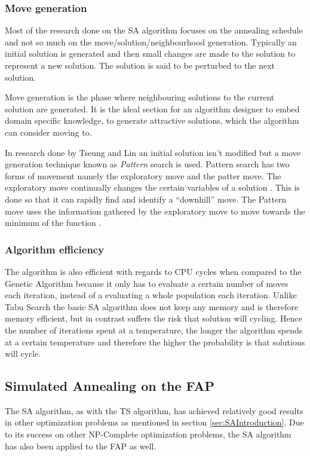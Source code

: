 \subsubsection{Move generation}
Most of the research done on the SA algorithm focuses on the annealing schedule and not so much on the move/solution/neighbourhood generation. Typically an initial solution is generated and then small changes are made to the solution to represent a new solution. The solution is said to be perturbed to the next solution.

Move generation is the phase where neighbouring solutions to the current solution are generated. It is the ideal section for an algorithm designer to embed domain specific knowledge, to generate attractive solutions, which the algorithm can consider moving to.

In research done by Tseung and Lin \cite{CurveFittingSA} an initial solution isn't modified but a move generation technique known as \emph{Pattern} search is used. Pattern search has two forms of movement namely the exploratory move and the patter move. The exploratory move continually changes the certain variables of a solution \cite{CurveFittingSA}. This is done so that it can rapidly find and identify a ``downhill'' move. The Pattern move uses the information gathered by the exploratory move to move towards the minimum of the function \cite{CurveFittingSA}.
\subsubsection{Algorithm efficiency}
The algorithm is also efficient with regards to CPU cycles when compared to the Genetic Algorithm because it only has to evaluate a certain number of moves each iteration, instead of a evaluating a whole population each iteration. Unlike Tabu Search the basic SA algorithm does not keep any memory and is therefore memory efficient, but in contrast suffers the risk that solution will cycling. Hence the number of iterations spent at a temperature, the longer the algorithm spends at a certain temperature and therefore the higher the probability is that solutions will cycle.
\subsection{Simulated Annealing on the FAP}
The SA algorithm, as with the TS algorithm, has achieved relatively good results in other optimization problems as mentioned in section \ref{sec:SAIntroduction}. Due to its success on other NP-Complete optimization problems, the SA algorithm has also been applied to the FAP as well.

